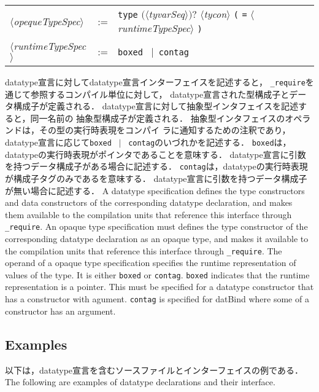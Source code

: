 \documentclass{jbook}
\newcommand{\txt}[2]{#2}
\newcommand{\code}[1]{\mbox{\large\tt #1}}
\newcommand{\vbar}{\mbox{\ $|$\ }}
\newcommand{\nonterm}[1]{\mbox{$\langle$}{\it #1}\mbox{$\rangle$}}
\newcommand{\term}[1]{\mbox{{\tt #1}}}
\newcommand{\optional}[1]{\mbox{$($}{\protect #1}\mbox{$)?$}}
\begin{document}
\begin{center}
\begin{tabular}{lcll}
\nonterm{opequeTypeSpec}
  &:= & \term{type} \optional{\nonterm{tyvarSeq}} \nonterm{tycon} 
        \term{(} \term{=} \nonterm{runtimeTypeSpec} \term{)}\\
\nonterm{runtimeTypeSpec}
  &:= & \term{boxed} \vbar \term{contag}
\end{tabular}
\end{center}
\ifjp%
	datatype宣言に対してdatatype宣言インターフェイスを記述すると，
\code{\_require}を通じて参照するコンパイル単位に対して，
datatype宣言された型構成子とデータ構成子が定義される．
	datatype宣言に対して抽象型インタフェイスを記述すると，同一名前の
抽象型構成子が定義される．
	抽象型インタフェイスのオペランドは，その型の実行時表現をコンパイ
ラに通知するための注釈であり，datatype宣言に応じて\term{boxed} \vbar
\term{contag}のいづれかを記述する．
	\term{boxed}は，datatypeの実行時表現がポインタであることを意味する．
	datatype宣言に引数を持つデータ構成子がある場合に記述する．
	\term{contag}は，datatypeの実行時表現が構成子タグのみであるを意味する．
	datatype宣言に引数を持つデータ構成子が無い場合に記述する．
\else%
	A datatype specification defines the type constructors and data
constructors of the corresponding datatype declaration, and makes them
available to the compilation units that reference this interface through 
\code{\_require}.
	An opaque type specification must defines the type
constructor of the corresponding datatype declaration as an opaque type,
and makes it available to the compilation units that reference this
interface through  \code{\_require}.
	The operand of a opaque type specification specifies the runtime 
representation of values of the type. 
	It is either \term{boxed} or \term{contag}.
	\term{boxed} indicates that the runtime representation is a
pointer.
	This must be specified for a datatype constructor that has a
constructor with agument.
	\term{contag} is specified for datBind where some of a
constructor has an argument.
\fi%

\subsection{\txt{datatype宣言とインタフェイスの例}{Examples}}
\ifjp%
	以下は，datatype宣言を含むソースファイルとインターフェイスの例である．
\else%
	The following are examples of datatype declarations and their interface.
\fi%
\end{document}

